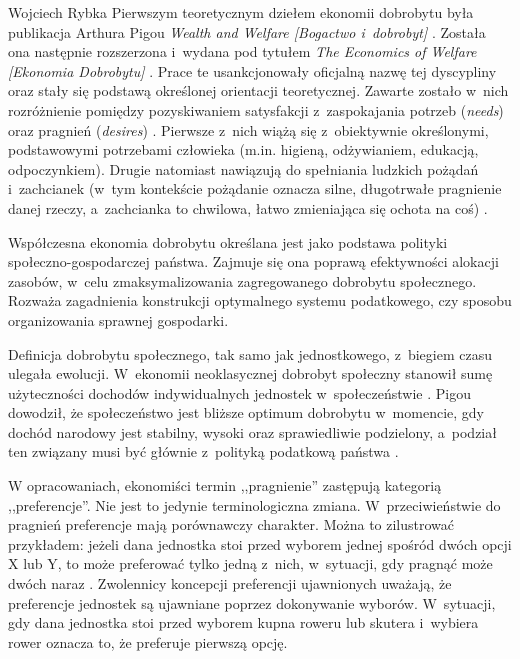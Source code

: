 \begin{artplenv}{Wojciech Rybka}
Pierwszym teoretycznym dziełem ekonomii dobrobytu była publikacja Arthura Pigou  \textit{Wealth and Welfare
[Bogactwo i~dobrobyt]}
\parencite*{pigou_wealth_1912}.
Została ona następnie rozszerzona i~wydana pod tytułem \textit{The
Economics of Welfare [Ekonomia Dobrobytu]}
\parencite*{pigou_economics_1920}.
Prace te usankcjonowały oficjalną nazwę tej
dyscypliny oraz stały się podstawą określonej orientacji teoretycznej. Zawarte zostało w~nich rozróżnienie pomiędzy
pozyskiwaniem satysfakcji z~zaspokajania potrzeb (\mbox{\textit{needs}}) oraz pragnień (\textit{desires})
\parencite{czech_ekonomia_2014}.
Pierwsze z~nich wiążą się z~obiektywnie określonymi, podstawowymi potrzebami
człowieka (m.in. higieną, odżywianiem, edukacją, odpoczynkiem). Drugie natomiast nawiązują do spełniania ludzkich
pożądań i~zachcianek (w~tym kontekście pożądanie oznacza silne, długotrwałe pragnienie danej rzeczy, a~zachcianka to
chwilowa, łatwo zmieniająca się ochota na coś)
\parencite{czech_ekonomia_2014}.

Współczesna ekonomia dobrobytu określana jest jako podstawa polityki społeczno-gospodarczej państwa. Zajmuje się ona
poprawą efektywności alokacji zasobów, w~celu zmaksymalizowania zagregowanego dobrobytu społecznego. Rozważa
zagadnienia konstrukcji optymalnego systemu podatkowego, czy sposobu organizowania sprawnej gospodarki.

Definicja dobrobytu społecznego, tak samo jak jednostkowego, z~biegiem czasu ulegała ewolucji. W~ekonomii neoklasycznej
dobrobyt społeczny stanowił sumę użyteczności dochodów indywidualnych jednostek w~społeczeństwie
\parencite{zaremba_dobrobyt_2016}.
Pigou dowodził, że społeczeństwo jest bliższe optimum
dobrobytu w~momencie, gdy dochód narodowy jest stabilny, wysoki oraz sprawiedliwie podzielony, a~podział ten związany musi być
głównie z~polityką podatkową państwa
\parencite{zaremba_dobrobyt_2016}.

W opracowaniach, ekonomiści termin ,,pragnienie'' zastępują kategorią ,,preferencje''. Nie jest to jedynie terminologiczna
zmiana. W~przeciwieństwie do pragnień preferencje mają porównawczy charakter. Można to zilustrować przykładem: jeżeli
dana jednostka stoi przed wyborem jednej spośród dwóch opcji X lub Y, to może preferować tylko jedną z~nich,
w~sytuacji, gdy pragnąć może dwóch naraz
\parencite{kwarcinski_koncepcje_2016}.
Zwolennicy koncepcji
preferencji ujawnionych uważają,
że preferencje jednostek są ujawniane poprzez dokonywanie wyborów. W~sytuacji, gdy dana jednostka
stoi przed wyborem kupna roweru lub skutera i~wybiera rower oznacza to, że preferuje pierwszą opcję. 


\end{artplenv}
